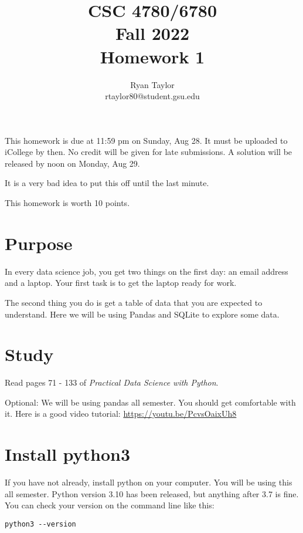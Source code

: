 \documentclass[11pt,english]{article}
\begin{document}
\title{CSC 4780/6780 \\
Fall 2022\\ Homework 1}
\author{Ryan Taylor \\ rtaylor80@student.gsu.edu}
\maketitle

This homework is due at 11:59 pm on Sunday, Aug 28.  It must be uploaded to iCollege by then.  No credit will be given for late submissions.  A solution will be released by noon on Monday,  Aug 29.

It is a very bad idea to put this off until the last minute.

This homework is worth 10 points.

\section{Purpose}

In every data science job,  you get two things on the first day: an email address and a laptop.  Your first task is to get the laptop ready for work.

The second thing you do is get a table of data that you are expected to understand.  Here we will be using Pandas and SQLite to explore some data.

\section{Study}

Read pages 71 -  133 of \textit{Practical Data Science with Python}.

Optional: We will be using pandas all semester. You should get comfortable with it.  Here is a good video tutorial:
\url{https://youtu.be/PcvsOaixUh8}

\section{Install python3}

If you have not already,  install python on your computer.  You will be using this all semester.
Python version 3.10 has been released,  but anything after 3.7 is fine.  You can check your version
on the command line like this:

\begin{Verbatim}
python3 --version
\end{Verbatim}
\end{document}
